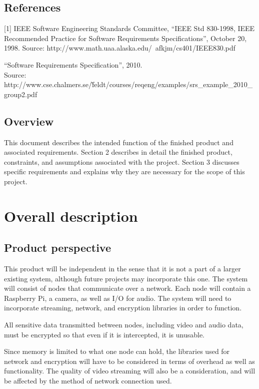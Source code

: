 \documentclass[onecolumn, draftclsnofoot,10pt, compsoc]{IEEEtran}
\begin{document}
\subsection{References}
[1] IEEE Software Engineering Standards Committee, “IEEE Std 830-1998, IEEE Recommended Practice for Software Requirements Specifications”, October 20, 1998. Source: http://www.math.uaa.alaska.edu/~afkjm/cs401/IEEE830.pdf

\noindent[2] “Software Requirements Specification”, 2010. \\
\noindent Source: http://www.cse.chalmers.se/\~feldt/courses/reqeng/examples/srs\_example\_2010\_group2.pdf

\subsection{Overview}
This document describes the intended function of the finished product and associated requirements. Section 2 describes in detail the finished product, constraints, and assumptions associated with the project. Section 3 discusses specific requirements and explains why they are necessary for the scope of this project.

\section{Overall description}

\subsection{Product perspective}
This product will be independent in the sense that it is not a part of a larger existing system, although future projects may incorporate this one. The system will consist of nodes that communicate over a network. Each node will contain a Raspberry Pi, a camera, as well as I/O for audio. The system will need to incorporate streaming, network, and encryption libraries in order to function.

\noindent All sensitive data transmitted between nodes, including video and audio data, must be encrypted so that even if it is intercepted, it is unusable.  

\noindent Since memory is limited to what one node can hold, the libraries used for network and encryption will have to be considered in terms of overhead as well as functionality. The quality of video streaming will also be a consideration, and will be affected by the method of network connection used. 
\end{document}
